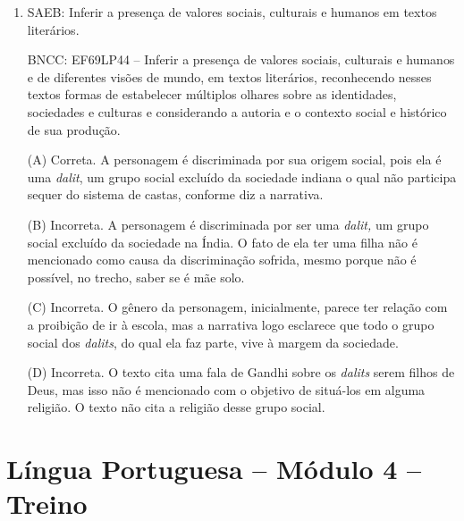 \begin{enumerate}
\item
SAEB: Inferir a presença de valores sociais, culturais e humanos em
textos literários. 

BNCC: EF69LP44 -- Inferir a presença de valores
sociais, culturais e humanos e de diferentes visões de mundo, em textos
literários, reconhecendo nesses textos formas de estabelecer múltiplos
olhares sobre as identidades, sociedades e culturas e considerando a
autoria e o contexto social e histórico de sua produção.

(A) Correta. A personagem é discriminada por sua origem social, pois ela
é uma \emph{dalit}, um grupo social excluído da sociedade indiana o qual
não participa sequer do sistema de castas, conforme diz a narrativa.

(B) Incorreta. A personagem é discriminada por ser uma \emph{dalit,} um
grupo social excluído da sociedade na Índia. O fato de ela ter uma filha
não é mencionado como causa da discriminação sofrida, mesmo porque não é
possível, no trecho, saber se é mãe solo.

(C) Incorreta. O gênero da personagem, inicialmente, parece ter relação
com a proibição de ir à escola, mas a narrativa logo esclarece que todo
o grupo social dos \emph{dalits}, do qual ela faz parte, vive à margem
da sociedade.

(D) Incorreta. O texto cita uma fala de Gandhi sobre os \emph{dalits}
serem filhos de Deus, mas isso não é mencionado com o objetivo de
situá-los em alguma religião. O texto não cita a religião desse grupo
social.
\end{enumerate}

\section*{Língua Portuguesa – Módulo 4 – Treino}

